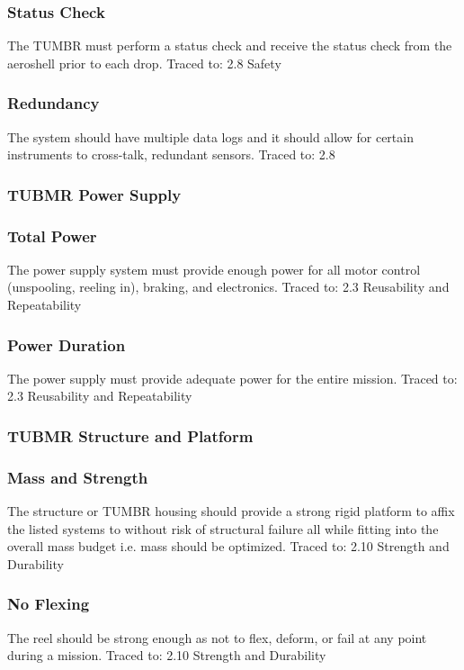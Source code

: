 \subsubsection*{Status Check}
\indent\indent The TUMBR must perform a status check and receive the status check from the aeroshell prior to each drop. Traced to: 2.8 Safety

\subsubsection*{Redundancy}
\indent\indent The system should have multiple data logs and it should allow for certain instruments to cross-talk, redundant sensors. Traced to: 2.8

\subsubsection{TUBMR Power Supply}

\subsubsection*{Total Power}
\indent\indent The power supply system must provide enough power for all motor control (unspooling, reeling in), braking, and electronics. Traced to: 2.3 Reusability and Repeatability

\subsubsection*{Power Duration}
\indent\indent The power supply must provide adequate power for the entire mission. Traced to: 2.3 Reusability and Repeatability

\subsubsection{TUBMR Structure and Platform}
 
\subsubsection*{Mass and Strength}
\indent\indent The structure or TUMBR housing should provide a strong rigid platform to affix the listed systems to without risk of structural failure all while fitting into the overall mass budget i.e. mass should be optimized. Traced to: 2.10 Strength and Durability

\subsubsection*{No Flexing}
\indent\indent The reel should be strong enough as not to flex, deform, or fail at any point during a mission. Traced to: 2.10 Strength and Durability


